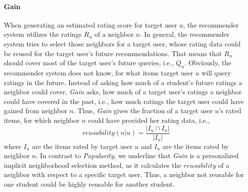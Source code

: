 \documentclass[manuscript,review,anonymous]{acmart}
\begin{document}
\paragraph{Gain}
When generating an estimated rating score for target user $u$, the recommender system utilizes the ratings $R_n$ of a neighbor $n$.
In general, the recommender system tries to select those neighbors for a target user, whose rating data could be reused for the target user's future recommendations.
That means that $R_n$ should cover most of the target user's future queries, i.e., $Q_u$.
Obviously, the recommender system does not know, for what items target user $u$ will query ratings in the future. 
Instead of asking how much of a student's future ratings a neighbor could cover, \emph{Gain} asks, how much of a target user's ratings a neighbor could have covered in the past, i.e., how much ratings the target user could have gained from neighbor $n$.
Thus, \emph{Gain} gives the fraction of a target user $u$'s rated items, for which neighbor $n$ could have provided her rating data, i.e., 
\begin{equation}
    reusability(n|u) = \frac{|I_u \cap I_n|}{|I_u|}
\end{equation}
where $I_u$ are the items rated by target user $u$ and $I_n$ are the items rated by neighbor $n$.
In contrast to \emph{Popularity}, we underline that \emph{Gain} is a personalized implicit neighborhood selection method, as it calculates the $reusability$ of a neighbor with respect to a specific target user.
Thus, a neighbor not reusable for one student could be highly reusable for another student.
\end{document}
